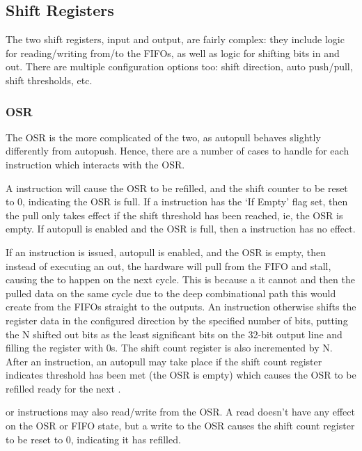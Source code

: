 \subsection{Shift Registers}

The two shift registers, input and output, are fairly complex: they include logic for reading/writing from/to the FIFOs, as well as logic for shifting bits in and out. There are multiple configuration options too: shift direction, auto push/pull, shift thresholds, etc.


\subsubsection{OSR}

The OSR is the more complicated of the two, as autopull behaves slightly differently from autopush. Hence, there are a number of cases to handle for each instruction which interacts with the OSR.

A  instruction will cause the OSR to be refilled, and the shift counter to be reset to 0, indicating the OSR is full. If a  instruction has the `If Empty' flag set, then the pull only takes effect if the shift threshold has been reached, ie, the OSR is empty. If autopull is enabled and the OSR is full, then a  instruction has no effect.

If an  instruction is issued, autopull is enabled, and the OSR is empty, then instead of executing an out, the hardware will pull from the FIFO and stall, causing the  to happen on the next cycle. This is because a it cannot  and then  the pulled data on the same cycle due to the deep combinational path this would create from the FIFOs straight to the outputs. An  instruction otherwise shifts the register data in the configured direction by the specified number of bits, putting the N shifted out bits as the least significant bits on the 32-bit output line and filling the register with 0s. The shift count register is also incremented by N. After an  instruction, an autopull may take place if the shift count register indicates threshold has been met (the OSR is empty) which causes the OSR to be refilled ready for the next .

 or  instructions may also read/write from the OSR. A read doesn't have any effect on the OSR or FIFO state, but a write to the OSR causes the shift count register to be reset to 0, indicating it has refilled.

